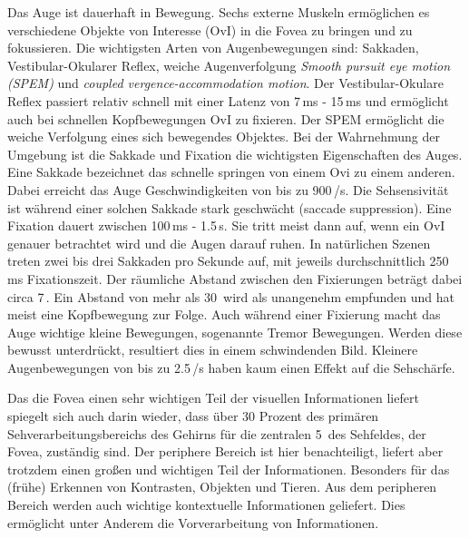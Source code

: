 Das Auge ist dauerhaft in Bewegung.
Sechs externe Muskeln ermöglichen es verschiedene Objekte von Interesse (OvI) in die Fovea zu bringen und zu fokussieren.
Die wichtigsten Arten von Augenbewegungen sind: Sakkaden, Vestibular-Okularer Reflex, weiche Augenverfolgung \emph{Smooth pursuit eye motion (SPEM)} und \emph{coupled vergence-accommodation motion}.
Der Vestibular-Okulare Reflex passiert relativ schnell mit einer Latenz von 7\,ms - 15\,ms und ermöglicht auch bei schnellen Kopfbewegungen OvI zu fixieren.
Der SPEM ermöglicht die weiche Verfolgung eines sich bewegendes Objektes.
Bei der Wahrnehmung der Umgebung ist die Sakkade und Fixation die wichtigsten Eigenschaften des Auges.
Eine Sakkade bezeichnet das schnelle springen von einem Ovi zu einem anderen.
Dabei erreicht das Auge Geschwindigkeiten von bis zu 900\,\textdegree/s.
Die Sehsensivität ist während einer solchen Sakkade stark geschwächt (saccade suppression).
Eine Fixation dauert zwischen 100\,ms - 1.5\,s.
Sie tritt meist dann auf, wenn ein OvI genauer betrachtet wird und die Augen darauf ruhen.
In natürlichen Szenen treten zwei bis drei Sakkaden pro Sekunde auf, mit jeweils durchschnittlich 250\,ms Fixationszeit.
Der räumliche Abstand zwischen den Fixierungen beträgt dabei circa 7\,\textdegree{}.
Ein Abstand von mehr als 30\,\textdegree{} wird als unangenehm empfunden und hat meist eine Kopfbewegung zur Folge.
Auch während einer Fixierung macht das Auge wichtige kleine Bewegungen, sogenannte Tremor Bewegungen.
Werden diese bewusst unterdrückt, resultiert dies in einem schwindenden Bild.
Kleinere Augenbewegungen von bis zu 2.5\,\textdegree{}/s haben kaum einen Effekt auf die Sehschärfe.

Das die Fovea einen sehr wichtigen Teil der visuellen Informationen liefert spiegelt sich auch darin wieder, dass über 30 Prozent des primären Sehverarbeitungsbereichs des Gehirns für die zentralen 5\,\textdegree{} des Sehfeldes, der Fovea, zuständig sind.
Der periphere Bereich ist hier benachteiligt, liefert aber trotzdem einen großen und wichtigen Teil der Informationen.
Besonders für das (frühe) Erkennen von Kontrasten, Objekten und Tieren.
Aus dem peripheren Bereich werden auch wichtige kontextuelle Informationen geliefert.
Dies ermöglicht unter Anderem die Vorverarbeitung von Informationen.

